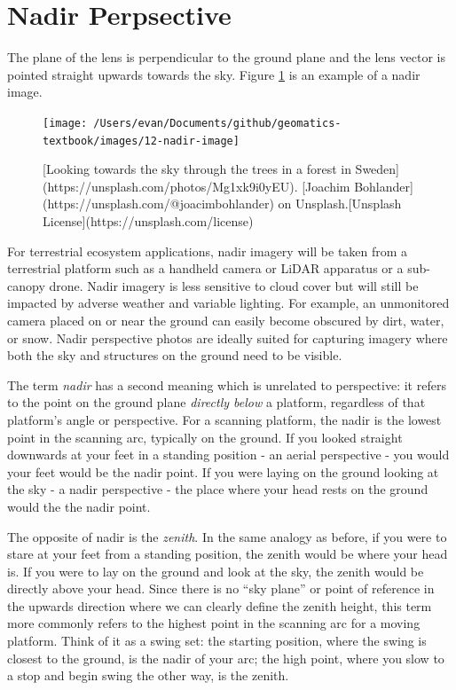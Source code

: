 \documentclass[
]{book}
\begin{document}
\hypertarget{nadir-perpsective}{%
\section{Nadir Perpsective}\label{nadir-perpsective}}

The plane of the lens is perpendicular to the ground plane and the lens vector is pointed straight upwards towards the sky. Figure \ref{fig:12-nadir-image} is an example of a nadir image.

\begin{figure}
\texttt{[image: /Users/evan/Documents/github/geomatics-textbook/images/12-nadir-image]} \caption{[Looking towards the sky through the trees in a forest in Sweden](https://unsplash.com/photos/Mg1xk9i0yEU). [Joachim Bohlander](https://unsplash.com/@joacimbohlander) on Unsplash.[Unsplash License](https://unsplash.com/license)}\label{fig:12-nadir-image}
\end{figure}

For terrestrial ecosystem applications, nadir imagery will be taken from a terrestrial platform such as a handheld camera or LiDAR apparatus or a sub-canopy drone. Nadir imagery is less sensitive to cloud cover but will still be impacted by adverse weather and variable lighting. For example, an unmonitored camera placed on or near the ground can easily become obscured by dirt, water, or snow. Nadir perspective photos are ideally suited for capturing imagery where both the sky and structures on the ground need to be visible.

The term \emph{nadir} has a second meaning which is unrelated to perspective: it refers to the point on the ground plane \emph{directly below} a platform, regardless of that platform's angle or perspective. For a scanning platform, the nadir is the lowest point in the scanning arc, typically on the ground. If you looked straight downwards at your feet in a standing position - an aerial perspective - you would your feet would be the nadir point. If you were laying on the ground looking at the sky - a nadir perspective - the place where your head rests on the ground would the the nadir point.

The opposite of nadir is the \emph{zenith}. In the same analogy as before, if you were to stare at your feet from a standing position, the zenith would be where your head is. If you were to lay on the ground and look at the sky, the zenith would be directly above your head. Since there is no ``sky plane'' or point of reference in the upwards direction where we can clearly define the zenith height, this term more commonly refers to the highest point in the scanning arc for a moving platform. Think of it as a swing set: the starting position, where the swing is closest to the ground, is the nadir of your arc; the high point, where you slow to a stop and begin swing the other way, is the zenith.
\end{document}
